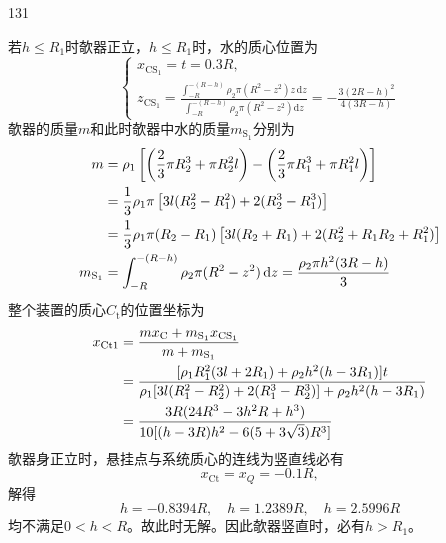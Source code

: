 \begin{solution}{131}
\begin{subsolution}
        若$h \leq R _ { 1 }$时欹器正立，$h \leq R _ { 1 }$时，水的质心位置为
        \begin{equation}
            \left\{ \begin{array}{l} x _ {\mathrm{CS} _ {1}} = t = 0.3 R, \\ z _ {\mathrm{CS} _ {1}} = \frac {\int_ {- R} ^ {- (R - h)} \rho_ {2} \pi \left(R ^ {2} - z ^ {2}\right) z \, \mathrm{d} z}{\int_ {- R} ^ {- (R - h)} \rho_ {2} \pi \left(R ^ {2} - z ^ {2}\right) \mathrm{d} z} = - \frac {3 (2 R - h) ^ {2}}{4 (3 R - h)} \end{array} \right.
            \label{eq:27.s131}
        \end{equation}
        欹器的质量$m$和此时欹器中水的质量$m _ { \mathrm { S } _ { 1 } }$分别为
        \begin{align}
            m &= \rho_ {1} \left[ \left(\frac {2}{3} \pi R _ {2} ^ {3} + \pi R _ {2} ^ {2} l\right) - \left(\frac {2}{3} \pi R _ {1} ^ {3} + \pi R _ {1} ^ {2} l\right) \right] \notag \\
            &= \frac {1}{3} \rho_ {1} \pi \left[ 3 l (R _ {2} ^ {2} - R _ {1} ^ {2}) + 2 (R _ {2} ^ {3} - R _ {1} ^ {3}) \right] \notag \\
            &= \frac {1}{3} \rho_ {1} \pi (R _ {2} - R _ {1}) \left[ 3 l (R _ {2} + R _ {1}) + 2 (R _ {2} ^ {2} + R _ {1} R _ {2} + R _ {1} ^ {2}) \right] \label{eq:28.s131} \\
            m _ {\mathrm{S} _ {1}} &= \int_ {- R} ^ {- (R - h)} \rho_ {2} \pi (R ^ {2} - z ^ {2}) \, \mathrm{d} z = \frac {\rho_ {2} \pi h ^ {2} (3 R - h)}{3} \label{eq:29.s131}
        \end{align}
        整个装置的质心$C _ { \mathrm { t } }$的位置坐标为
        \begin{align}
            x _ {\mathrm{Ct1}} &= \frac {m x _ {\mathrm{C}} + m _ {\mathrm{S} _ {1}} x _ {\mathrm{CS} _ {1}}}{m + m _ {\mathrm{S} _ {1}}} \notag \\
            &= \frac {[ \rho_ {1} R _ {1} ^ {2} (3 l + 2 R _ {1}) + \rho_ {2} h ^ {2} (h - 3 R _ {1}) ] t}{\rho_ {1} [ 3 l (R _ {1} ^ {2} - R _ {2} ^ {2}) + 2 (R _ {1} ^ {3} - R _ {2} ^ {3}) ] + \rho_ {2} h ^ {2} (h - 3 R _ {1})} \notag \\
            &= \frac {3 R (24 R ^ {3} - 3 h ^ {2} R + h ^ {3})}{10 [ (h - 3 R) h ^ {2} - 6 (5 + 3 \sqrt {3}) R ^ {3} ]}
            \label{eq:30.s131}
        \end{align}
        欹器身正立时，悬挂点与系统质心的连线为竖直线必有
        \begin{equation}
            x _ {\mathrm{Ct}} = x _ {Q} = - 0.1 R,
            \label{eq:31.s131}
        \end{equation}
        解得
        \begin{equation}
            h = - 0.8394 R, \quad h = 1.2389 R, \quad h = 2.5996 R
            \label{eq:32.s131}
        \end{equation}
        均不满足$0 < h < R$。故此时无解。因此欹器竖直时，必有$h > R _ { 1 }$。


\end{subsolution}
\end{solution}
